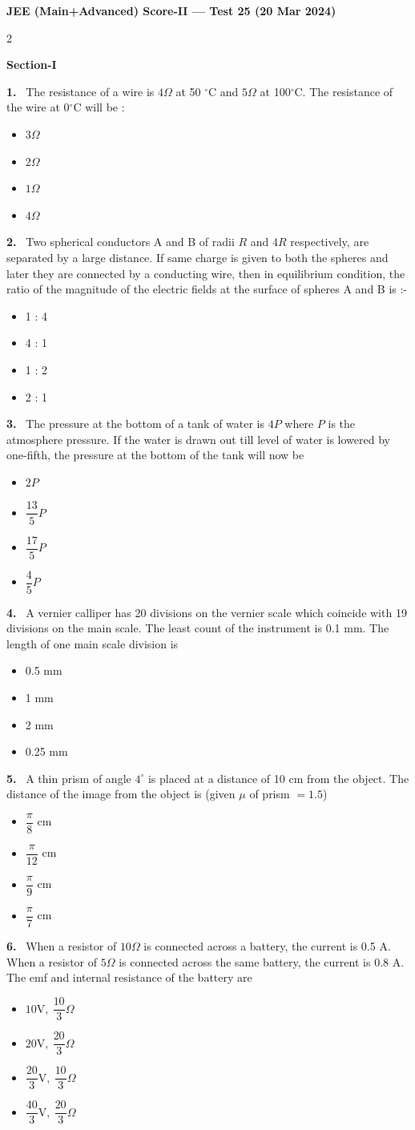 \documentclass[10pt]{extarticle}
\newcommand{\papersec}[1]{\par\bigskip{\centering\Large\bfseries PAPER-#1\par}\medskip}
\newcommand{\partsec}[2]{\par\medskip\noindent{\large\bfseries PART-#1: #2}\par\smallskip}
\newcommand{\sect}[1]{\par\smallskip\noindent\textbf{#1}\par}
\newcommand{\qn}[1]{\par\smallskip\noindent\textbf{#1.}~}
\newenvironment{qoptions}{\begin{itemize}[leftmargin=1.8em,itemsep=1pt,topsep=2pt,label={}]}{\end{itemize}}
\newcommand{\opt}[2]{\item[(#1)] #2}
\begin{document}
\begin{center}{\Large\bfseries JEE (Main+Advanced) Score-II --- Test 25 (20 Mar 2024)}\end{center}
\begin{multicols}{2}
\raggedcolumns
\papersec{1}
\partsec{1}{PHYSICS}
\sect{Section-I}

\qn{1} The resistance of a wire is $4\Omega$ at 50 $^\circ$C and $5\Omega$ at 100$^\circ$C. The resistance of the wire at 0$^\circ$C will be :
\begin{qoptions}
\opt{A}{$3\Omega$}
\opt{B}{$2\Omega$}
\opt{C}{$1\Omega$}
\opt{D}{$4\Omega$}
\end{qoptions}

\qn{2} Two spherical conductors A and B of radii $R$ and $4R$ respectively, are separated by a large distance. If same charge is given to both the spheres and later they are connected by a conducting wire, then in equilibrium condition, the ratio of the magnitude of the electric fields at the surface of spheres A and B is :-
\begin{qoptions}
\opt{A}{1 : 4}
\opt{B}{4 : 1}
\opt{C}{1 : 2}
\opt{D}{2 : 1}
\end{qoptions}

\qn{3} The pressure at the bottom of a tank of water is $4P$ where $P$ is the atmosphere pressure. If the water is drawn out till level of water is lowered by one-fifth, the pressure at the bottom of the tank will now be
\begin{qoptions}
\opt{A}{$2P$}
\opt{B}{$\dfrac{13}{5}P$}
\opt{C}{$\dfrac{17}{5}P$}
\opt{D}{$\dfrac45P$}
\end{qoptions}

\qn{4} A vernier calliper has 20 divisions on the vernier scale which coincide with 19 divisions on the main scale. The least count of the instrument is 0.1 mm. The length of one main scale division is
\begin{qoptions}
\opt{A}{0.5 mm}
\opt{B}{1 mm}
\opt{C}{2 mm}
\opt{D}{0.25 mm}
\end{qoptions}

\qn{5} A thin prism of angle $4^\circ$ is placed at a distance of 10 cm from the object. The distance of the image from the object is (given $\mu$ of prism $=1.5$)
\begin{qoptions}
\opt{A}{$\dfrac{\pi}{8}$ cm}
\opt{B}{$\dfrac{\pi}{12}$ cm}
\opt{C}{$\dfrac{\pi}{9}$ cm}
\opt{D}{$\dfrac{\pi}{7}$ cm}
\end{qoptions}

\qn{6} When a resistor of $10\Omega$ is connected across a battery, the current is 0.5 A. When a resistor of $5\Omega$ is connected across the same battery, the current is 0.8 A. The emf and internal resistance of the battery are
\begin{qoptions}
\opt{A}{$10\mathrm{V},\ \dfrac{10}{3}\Omega$}
\opt{B}{$20\mathrm{V},\ \dfrac{20}{3}\Omega$}
\opt{C}{$\dfrac{20}{3}\mathrm{V},\ \dfrac{10}{3}\Omega$}
\opt{D}{$\dfrac{40}{3}\mathrm{V},\ \dfrac{20}{3}\Omega$}
\end{qoptions}


\end{multicols}
\end{document}
